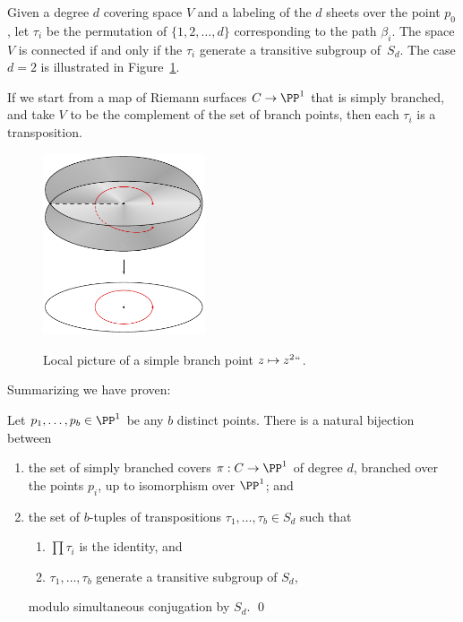 Given a degree $d$ covering space $V$ and a labeling of the $d$ sheets
over the point $p_0$, let $\tau_i$ be the permutation of $\{1,2,\dots,d\}$
corresponding to the path $\beta_i$. The space $V$ is connected if and
only if the $\tau_{i}$ generate a transitive subgroup of~$S_{d}$. The
case $d=2$ is illustrated in Figure~\ref{square root function graph}.

If we start from a map of Riemann surfaces $C\to \PP^{1}$ that is
 simply branched, and take $V$ to be the complement of the set of
 branch points,
 then each $\tau_i$ is a transposition.

\begin{figure}
\includegraphics[height=2.1in,trim=0 2 0 0,clip]{main/Fig05-2-good}
\vskip-3pt
\caption{Local picture of a simple branch point $z \mapsto z^2` `$.
}
%
%
\label{square root function graph}
\end{figure}

Summarizing we have proven:
   \begin{lemma}
   \label{branched cover classification}
   Let $p_1,\dots, p_b \in \PP^1$ be any $b$
distinct
points. There is a
   natural bijection between
   \begin{enumerate}
   \item the set of  simply branched covers $\pi : C \to \PP^1$ of
   degree $d$, branched over the points $p_i$, up to isomorphism over
   $\PP^1$; and
   \item the set of $b$-tuples of transpositions $\tau_1, \dots, \tau_b
   \in S_d$ such that
\smallbreak
\begin{enumerate}
 \item $\prod \tau_i$ is the identity, and
 \item $\tau_1, \dots,
   \tau_b$ generate a transitive subgroup of $S_d$,
\end{enumerate}
\smallbreak
\noindent modulo simultaneous
   conjugation by $S_d$.
   \qed
   \end{enumerate}
\let\qed\relax
   \end{lemma}

